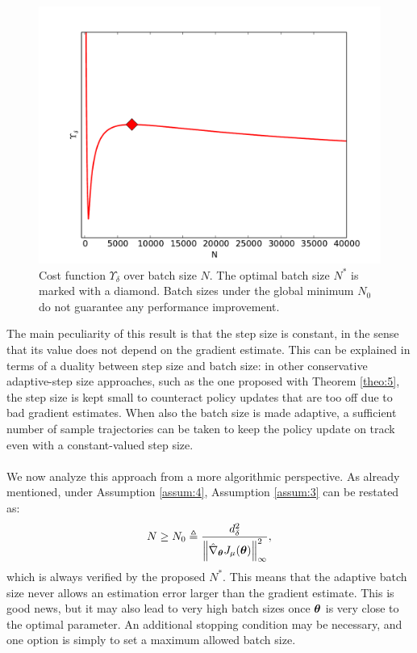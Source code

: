 \begin{figure}[H]
\includegraphics[width = \textwidth,center]{Images/upsilon.pdf}
\caption[Cost function $\Upsilon_\delta$ over batch size $N$.]{Cost function $\Upsilon_\delta$ over batch size $N$. The optimal batch size $N^*$ is marked with a diamond. Batch sizes under the global minimum $N_0$ do not guarantee any performance improvement.}
\label{fig:0}
\end{figure}

The main peculiarity of this result is that the step size is constant, in the sense that its value does not depend on the gradient estimate. This can be explained in terms of a duality between step size and batch size: in other conservative adaptive-step size approaches, such as the one proposed with Theorem \ref{theo:5}, the step size is kept small to counteract policy updates that are too off due to bad gradient estimates. When also the batch size is made adaptive, a sufficient number of sample trajectories can be taken to keep the policy update on track even with a constant-valued step size.
\paragraph{}
We now analyze this approach from a more algorithmic perspective.
As already mentioned, under Assumption \ref{assum:4}, Assumption \ref{assum:3} can be restated as:
\[
	N \geq N_0 \triangleq \frac{d_\delta^2}{\norm[\infty]{\gradApp{\vtheta}}^2},
\]
which is always verified by the proposed $N^*$. This means that the adaptive batch size never allows an estimation error larger than the gradient estimate. This is good news, but it may also lead to very high batch sizes once $\vtheta$ is very close to the optimal parameter. An additional stopping condition may be necessary, and one option is simply to set a maximum allowed batch size.
